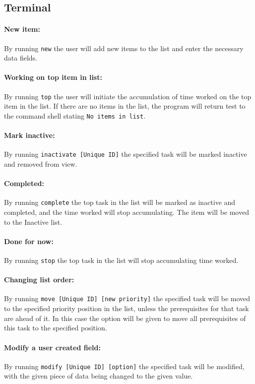 \documentclass[12pt]{article}
\newcommand{\e}[1] {{\tt #1}}
\begin{document}
\subsection{Terminal}
\setcounter{paragraph}{0}
\setcounter{subsubsection}{0}
\paragraph{New item:} \label{sec:New item} By running \e{new} the user will add new items to the list and enter the necessary data fields.
\paragraph{Working on top item in list:} \label{sec:Working on top} By running \e{top} the user will initiate the accumulation of time worked on the top item in the list. If there are no items in the list, the program will return test to the command shell stating \e{No items in list}.
\paragraph{Mark inactive:} \label{sec:Mark inactive} By running \e{inactivate [Unique ID]} the specified task will be marked inactive and removed from view.
\paragraph{Completed:} \label{sec:Completed} By running \e{complete} the top task in the list will be marked as inactive and completed, and the time worked will stop accumulating. The item will be moved to the Inactive list.
\paragraph{Done for now:} \label{sec:Done for now} By running \e{stop} the top task in the list will stop accumulating time worked.
\paragraph{Changing list order:} \label{sec:Change order} By running \e{move [Unique ID] [new priority]} the specified task will be moved to the specified priority position in the list, unless the prerequisites for that task are ahead of it. In this case the option will be given to move all prerequisites of this task to the specified position.
\paragraph{Modify a user created field:} \label{sec:Modify} By running \e{modify [Unique ID] [option]} the specified task will be modified, with the given piece of data being changed to the given value.
\end{document}
